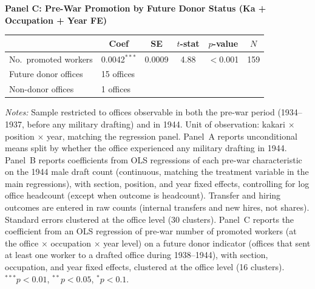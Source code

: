 \begin{table}[htbp]
\begin{threeparttable}
\bigskip

\textbf{Panel C: Pre-War Promotion by Future Donor Status (Ka + Occupation + Year FE)}
\medskip

\begin{tabular}{lccccc}
\toprule
 & Coef & SE & $t$-stat & $p$-value & $N$ \\
\midrule
No.\ promoted workers & 0.0042$^{***}$ & 0.0009 & 4.88 & $<$0.001 & 159 \\
\midrule
Future donor offices & \multicolumn{5}{l}{15 offices} \\
Non-donor offices    & \multicolumn{5}{l}{1 offices} \\
\bottomrule
\end{tabular}

\begin{tablenotes}[flushleft]
\footnotesize
\item \textit{Notes:} Sample restricted to offices observable in both the pre-war period (1934--1937, before any military drafting) and in 1944. Unit of observation: kakari $\times$ position $\times$ year, matching the regression panel. Panel~A reports unconditional means split by whether the office experienced any military drafting in 1944. Panel~B reports coefficients from OLS regressions of each pre-war characteristic on the 1944 male draft count (continuous, matching the treatment variable in the main regressions), with section, position, and year fixed effects, controlling for log office headcount (except when outcome is headcount). Transfer and hiring outcomes are entered in raw counts (internal transfers and new hires, not shares). Standard errors clustered at the office level (30 clusters). Panel~C reports the coefficient from an OLS regression of pre-war number of promoted workers (at the office $\times$ occupation $\times$ year level) on a future donor indicator (offices that sent at least one worker to a drafted office during 1938--1944), with section, occupation, and year fixed effects, clustered at the office level (16 clusters). $^{***}p<0.01$, $^{**}p<0.05$, $^{*}p<0.1$.
\end{tablenotes}
\end{threeparttable}
\end{table}
